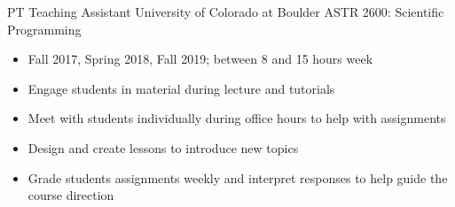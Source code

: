     {PT} %
    {Teaching Assistant} %
    {University of Colorado at Boulder} %
    {ASTR 2600: Scientific Programming}
    {\begin{itemize}
    \setlength\itemsep{0.1em} 
        \item Fall 2017, Spring 2018, Fall 2019; between 8 and 15 hours week
        \item Engage students in material during lecture and tutorials
        \item Meet with students individually during office hours to help with assignments
        \item Design and create lessons to introduce new topics
        \item Grade students assignments weekly and interpret responses to help guide the course direction
    \end{itemize}
}